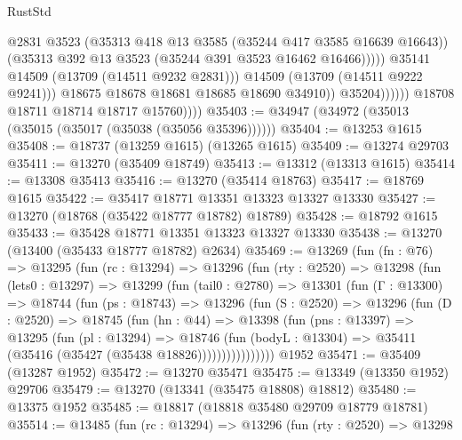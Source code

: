 \begin{lexlean}{RustStd}
\begin{coremodule}
                                      @2831
                                      @3523
                                      (@35313 @418 @13 @3585 (@35244 @417 @3585 @16639 @16643))
                                      (@35313 @392 @13 @3523 (@35244 @391 @3523 @16462 @16466)))))
                                @35141
                                @14509
                                (@13709 (@14511 @9232 @2831)))
                              @14509
                              (@13709 (@14511 @9222 @9241)))
                            @18675
                            @18678
                            @18681
                            @18685
                            @18690
                            @34910))
                        @35204))))))
            @18708
            @18711
            @18714
            @18717
            @15760))))
@35403 := @34947 (@34972 (@35013 (@35015 (@35017 (@35038 (@35056 @35396))))))
@35404 := @13253 @1615
@35408 := @18737 (@13259 @1615) (@13265 @1615)
@35409 := @13274 @29703
@35411 := @13270 (@35409 @18749)
@35413 := @13312 (@13313 @1615)
@35414 := @13308 @35413
@35416 := @13270 (@35414 @18763)
@35417 := @18769 @1615
@35422 := @35417 @18771 @13351 @13323 @13327 @13330
@35427 := @13270 (@18768 (@35422 @18777 @18782) @18789)
@35428 := @18792 @1615
@35433 := @35428 @18771 @13351 @13323 @13327 @13330
@35438 := @13270 (@13400 (@35433 @18777 @18782) @2634)
@35469 := @13269
    (fun (fn : @76) =>
    @13295
      (fun (rc : @13294) =>
      @13296
        (fun (rty : @2520) =>
        @13298
          (fun (lets0 : @13297) =>
          @13299
            (fun (tail0 : @2780) =>
            @13301
              (fun (Γ : @13300) =>
              @18744
                (fun (ps : @18743) =>
                @13296
                  (fun (S : @2520) =>
                  @13296
                    (fun (D : @2520) =>
                    @18745
                      (fun (hn : @44) =>
                      @13398
                        (fun (pns : @13397) =>
                        @13295
                          (fun (pl : @13294) =>
                          @18746
                            (fun (bodyL : @13304) =>
                            @35411 (@35416 (@35427 (@35438 @18826))))))))))))))))
    @1952
@35471 := @35409 (@13287 @1952)
@35472 := @13270 @35471
@35475 := @13349 (@13350 @1952) @29706
@35479 := @13270 (@13341 (@35475 @18808) @18812)
@35480 := @13375 @1952
@35485 := @18817 (@18818 @35480 @29709 @18779 @18781)
@35514 := @13485
    (fun (rc : @13294) =>
    @13296
      (fun (rty : @2520) =>
      @13298

\end{coremodule}
\end{lexlean}
